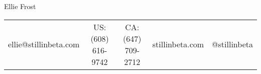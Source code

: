 \centering
\textmd{\Huge Ellie Frost} \\
\begin{tabular}{c | c | c | c | c}
ellie@stillinbeta.com &
US: (608) 616-9742 &
CA: (647) 709-2712 &
stillinbeta.com &
@stillinbeta
\end{tabular}

\raggedright

